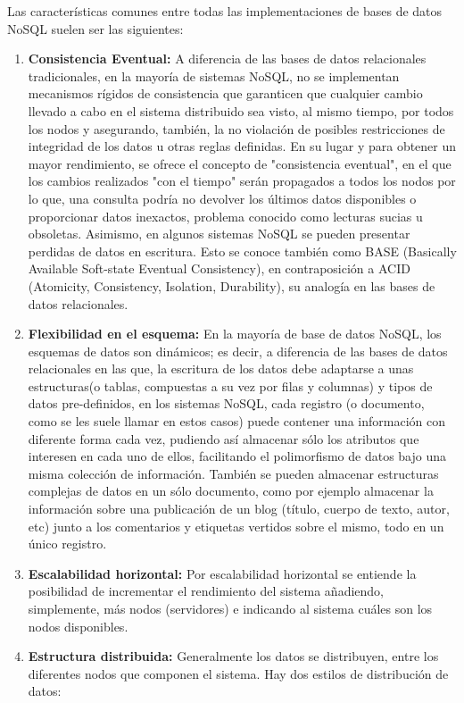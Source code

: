 Las características comunes entre todas las implementaciones de bases de datos NoSQL suelen ser las siguientes:
\begin{enumerate}
\item \textbf{Consistencia Eventual:} A diferencia de las bases de datos relacionales tradicionales, en la mayoría de sistemas NoSQL, no se implementan mecanismos rígidos de consistencia que garanticen que cualquier cambio llevado a cabo en el sistema distribuido sea visto, al mismo tiempo, por todos los nodos y asegurando, también, la no violación de posibles restricciones de integridad de los datos u otras reglas definidas. En su lugar y para obtener un mayor rendimiento, se ofrece el concepto de "consistencia eventual", en el que los cambios realizados "con el tiempo" serán propagados a todos los nodos por lo que, una consulta podría no devolver los últimos datos disponibles o proporcionar datos inexactos, problema conocido como lecturas sucias u obsoletas.
Asimismo, en algunos sistemas NoSQL se pueden presentar perdidas de datos en escritura. Esto se conoce también como BASE (Basically Available Soft-state Eventual Consistency), en contraposición a ACID (Atomicity, Consistency, Isolation, Durability), su analogía en las bases de datos relacionales.
\item \textbf{Flexibilidad en el esquema:} En la mayoría de base de datos NoSQL, los esquemas de datos son dinámicos; es decir, a diferencia de las bases de datos relacionales en las que, la escritura de los datos debe adaptarse a unas estructuras(o tablas, compuestas a su vez por filas y columnas) y tipos de datos pre-definidos, en los sistemas NoSQL, cada registro (o documento, como se les suele llamar en estos casos) puede contener una información con diferente forma cada vez, pudiendo así almacenar sólo los atributos que interesen en cada uno de ellos, facilitando el polimorfismo de datos bajo una misma colección de información. También se pueden almacenar estructuras complejas de datos en un sólo documento, como por ejemplo almacenar la información sobre una publicación de un blog (título, cuerpo de texto, autor, etc) junto a los comentarios y etiquetas vertidos sobre el mismo, todo en un único registro.
\item \textbf{Escalabilidad horizontal:} Por escalabilidad horizontal se entiende la posibilidad de incrementar el rendimiento del sistema añadiendo, simplemente, más nodos (servidores) e indicando al sistema cuáles son los nodos disponibles.
\item \textbf{Estructura distribuida:} Generalmente los datos se distribuyen, entre los diferentes nodos que componen el sistema. Hay dos estilos de distribución de datos:

\end{enumerate}
